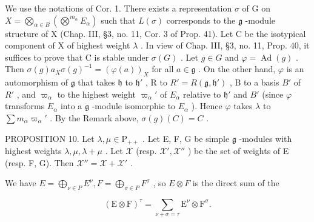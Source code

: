 We use the notations of Cor. 1. There exists a representation \(\sigma\) of G on \(X = \bigotimes_{\alpha \in B} (\bigotimes^{m_{\alpha}} E_{\alpha})\) such that \(L(\sigma)\) corresponds to the \(\mathfrak{g}\) -module structure of X (Chap. III, §3, no. 11, Cor. 3 of Prop. 41). Let C be the isotypical component of X of highest weight \(\lambda\) . In view of Chap. III, §3, no. 11, Prop. 40, it suffices to prove that C is stable under \(\sigma(G)\) . Let \(g \in G\) and \(\varphi = \operatorname{Ad}(g)\) . Then \(\sigma(g)a_X \sigma(g)^{-1} = (\varphi(a))_X\) for all \(a \in \mathfrak{g}\) . On the other hand, \(\varphi\) is an automorphism of \(\mathfrak{g}\) that takes \(\mathfrak{h}\) to \(\mathfrak{h}'\) , R to \(R' = R(\mathfrak{g}, \mathfrak{h}')\) , B to a basis \(B'\) of \(R'\) , and \(\varpi_{\alpha}\) to the highest weight \(\varpi_{\alpha}'\) of \(E_{\alpha}\) relative to \(\mathfrak{h}'\) and \(B'\) (since \(\varphi\) transforms \(E_{\alpha}\) into a \(\mathfrak{g}\) -module isomorphic to \(E_{\alpha}\) ). Hence \(\varphi\) takes \(\lambda\) to \(\sum m_{\alpha} \varpi_{\alpha}'\) . By the Remark above, \(\sigma(g)(C) = C\) .

PROPOSITION 10. Let \(\lambda, \mu \in \mathrm{P}_{++}\) . Let E, F, G be simple \(\mathfrak{g}\) -modules with highest weights \(\lambda, \mu, \lambda + \mu\) . Let \(\mathcal{X}\) (resp. \(\mathcal{X}', \mathcal{X}''\) ) be the set of weights of E (resp. F, G). Then \(\mathcal{X}'' = \mathcal{X} + \mathcal{X}'\) .

We have \(E = \bigoplus_{\nu \in P} E^{\nu}, F = \bigoplus_{\sigma \in P} F^{\sigma}\) , so \(E \otimes F\) is the direct sum of the

\[
(\mathrm{E} \otimes \mathrm{F}) ^ {\tau} = \sum_ {\nu + \sigma = \tau} \mathrm{E} ^ {\nu} \otimes \mathrm{F} ^ {\sigma}.
\]

